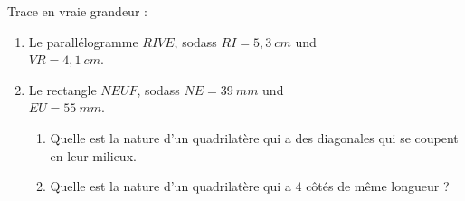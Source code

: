 \documentclass[10pt,openany]{book}
\begin{document}
\begin{multicols}{2}
Trace en vraie grandeur : \\
\begin{enumerate}

\item Le parall\'elogramme $RIVE$, sodass $RI=5,3~cm$ und \\$VR=4,1~cm$.
\item Le rectangle $NEUF$, sodass $NE=39~mm$ und \\$EU=55~mm$.
\begin{enumerate}

\item Quelle est la nature d'un quadrilat\`ere qui a des diagonales qui se coupent en leur milieux.
\item Quelle est la nature d'un quadrilat\`ere qui a $4$ c\^ot\'es de m\^eme longueur ?
\end{enumerate}

\end{enumerate}

\end{multicols}
\end{document}
